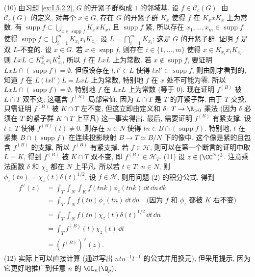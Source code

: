 \begin{solution}
(10) 由习题 \ref{ex:I.5.2.2}, $G$ 的开紧子群构成 $1$ 的邻域基. 设 $f \in \mathcal{C}_c(G)$. 由 $\mathcal{C}_c(G)$ 的定义, 对每个 $x \in G$, 存在 $G$ 的开紧子群 $K_x$ 使得 $f$ 在 $K_xxK_x$ 上为常数. 有 $\operatorname{supp} f \subset \bigcup_{x \in \operatorname{supp} f}K_xxK_x$, 且 $\operatorname{supp} f$ 紧, 所以存在 $x_1, \ldots, x_m \in \operatorname{supp} f$ 使得 $\operatorname{supp} f \subset \bigcup_{i=1}^m K_{x_i}x_iK_{x_i}$. 设 $L = \bigcap_{i=1}^m K_{x_i}$; 这是 $G$ 的开紧子群. 证明 $f$ 是双 $L$-不变的. 设 $x \in G$. 若 $x \in \operatorname{supp} f$, 则存在 $i \in \{1, \ldots, m\}$ 使得 $x \in K_{x_i}x_iK_{x_i}$. 则 $LxL \subset K_{x_i}^2x_iK_{x_i}^2$, 所以 $f$ 在 $LxL$ 上为常数. 若 $x \notin \operatorname{supp} f$, 要证明 $LxL \cap (\operatorname{supp} f) = \emptyset$. 但假设存在 $l, l' \in L$ 使得 $lxl' \in \operatorname{supp} f$, 则由刚才看到的, 知道 $f$ 在 $L(lxl')L = LxL$ 上为常数, 特别地 $f$ 在 $x$ 处不可能为零. 所以 $LxL \cap (\operatorname{supp} f) = \emptyset$, 特别地 $f$ 在 $LxL$ 上为常数 (等于 $0$).
现在证明 $f^{(B)}$ 被 $L \cap T$ 双不变; 这蕴含 $f^{(B)}$ 局部常值, 因为 $L \cap T$ 是 $T$ 的开紧子群. 由于 $T$ 交换, 只需证明 $f^{(B)}$ 被 $K \cap T$ 左不变, 但这立即由定义和 $\delta \colon T \to \R_{>0}$ 乘法 (因为 $\delta$ 必须在 $T$ 的紧子群 $K \cap T$ 上平凡) 这一事实得出.
最后, 需要证明 $f^{(B)}$ 有紧支撑. 设 $t \in T$ 使得 $f^{(B)}(t) \neq 0$. 则存在 $n \in N$ 使得 $tn \in B \cap (\operatorname{supp} f)$. 特别地, $t$ 在紧集 $B \cap (\operatorname{supp} f)$ 在连续投影映射 $B \to T \simeq B/N$ 下的像中. 这个像是紧的且包含 $f^{(B)}$ 的支撑, 所以 $f^{(B)}$ 有紧支撑.
若 $f \in \mathcal{H}$, 则可以在第一个断言的证明中取 $L = K$, 得到 $f^{(B)}$ 被 $K \cap T$ 双不变, 即 $f^{(B)} \in \mathcal{H}_T$.
(11) 设 $z \in (\CC^{\times})^3$. 注意乘法函数 $\delta$ 和 $\chi_z$ 都在 $N$ 上平凡. 所以若 $t \in T$, $n \in N$, 则 $\phi_z(tn) = \chi_z(t)\delta(t)^{1/2}$.
设 $f \in \mathcal{H}$. 则用问题 (2) 的积分公式, 得到
\begin{align*}
f^{\vee}(z) &= \int_T\int_N\int_K f(tnk)\phi_z(tnk)\,\dd t\,\dd n\,\dd k \\
&= \int_T\int_N f(tn)\phi_z(tn)\,\dd t\,\dd n \quad \text{(因为 } f \text{ 和 } \phi_z \text{ 都被 } K \text{ 右不变)} \\
&= \int_T\int_N f(tn)\chi_z(t)\delta(t)^{1/2}\,\dd t\,\dd n \\
&= \int_T f^{(B)}(t)\chi_z(t)\,\dd t \\
&= (f^{(B)})^{\vee}(z).
\end{align*}
(12) 实际上可以直接计算 (通过写出 $ntn^{-1}t^{-1}$ 的公式并用换元), 但采用提示, 因为它更好地推广到任意 $n$ 的 $\GL_n(\Q_p)$.

\end{solution}
